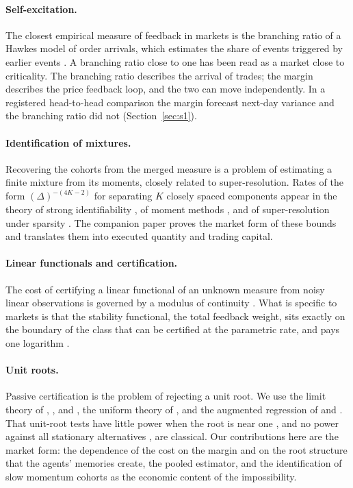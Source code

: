 \documentclass[12pt]{article}
\theoremstyle{definition}
\theoremstyle{remark}
\begin{document}
\paragraph{Self-excitation.} The closest empirical measure of feedback in markets is the branching ratio of a Hawkes model of order arrivals, which estimates the share of events triggered by earlier events \citep{filimonov2012,hardiman2013,bacry2015}. A branching ratio close to one has been read as a market close to criticality. The branching ratio describes the arrival of trades; the margin describes the price feedback loop, and the two can move independently. In a registered head-to-head comparison the margin forecast next-day variance and the branching ratio did not (Section~\ref{sec:s1}).

\paragraph{Identification of mixtures.} Recovering the cohorts from the merged measure is a problem of estimating a finite mixture from its moments, closely related to super-resolution. Rates of the form $(\Delta)^{-(4K-2)}$ for separating $K$ closely spaced components appear in the theory of strong identifiability \citep{heinrich2018}, of moment methods \citep{wu2020}, and of super-resolution under sparsity \citep{donoho1992super}. The companion paper \citep{niroula2026a} proves the market form of these bounds and translates them into executed quantity and trading capital.

\paragraph{Linear functionals and certification.} The cost of certifying a linear functional of an unknown measure from noisy linear observations is governed by a modulus of continuity \citep{ibragimov1984,donoho1994}. What is specific to markets is that the stability functional, the total feedback weight, sits exactly on the boundary of the class that can be certified at the parametric rate, and pays one logarithm \citep{niroula2026thesis}.

\paragraph{Unit roots.} Passive certification is the problem of rejecting a unit root. We use the limit theory of \citet{mannwald1943}, \citet{phillips1987}, \citet{chanwei1987} and \citet{phillips2007}, the uniform theory of \citet{mikusheva2007,mikusheva2012}, and the augmented regression of \citet{dickeyfuller1979} and \citet{saiddickey1984}. That unit-root tests have little power when the root is near one \citep{ers1996}, and no power against all stationary alternatives \citep{blough1992,faust1996,potscher2002}, are classical. Our contributions here are the market form: the dependence of the cost on the margin and on the root structure that the agents' memories create, the pooled estimator, and the identification of slow momentum cohorts as the economic content of the impossibility.
\end{document}
